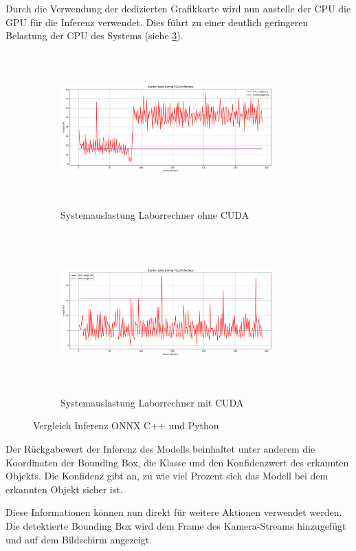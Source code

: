 Durch die Verwendung der dedizierten Grafikkarte wird nun anstelle der CPU die GPU für die Inferenz verwendet. Dies führt zu einer deutlich geringeren Belastung der CPU des Systems (siehe \ref{tab:CPU und RAM-Auslastung CPU vs CUDA}).

\begin{figure}[h!]
\centering
\begin{subfigure}[b]{\textwidth}
  \centering
  \includegraphics[width=0.9\textwidth,height=5.9cm,keepaspectratio]{images/system_load_plot_CPU_Laborrechner.png}
  \caption{Systemauslastung Laborrechner ohne CUDA}
  \label{fig:CPU und RAM-Auslastung ohne CUDA}
\end{subfigure}
\hfill
\begin{subfigure}[b]{\textwidth}
  \centering
  \includegraphics[width=0.9\textwidth,height=6.2cm,keepaspectratio]{images/system_load_plot_CUDA.png}
  \caption{Systemauslastung Laborrechner mit CUDA}
  \label{fig:CPU und RAM-Auslastung mit CUDA}
\end{subfigure}
\caption{Vergleich Inferenz ONNX C++ und Python}
\label{tab:CPU und RAM-Auslastung CPU vs CUDA}
\end{figure}

Der Rückgabewert der Inferenz des Modells beinhaltet unter anderem die Koordinaten der Bounding Box, die Klasse und den Konfidenzwert des erkannten Objekts. Die Konfidenz gibt an, zu wie viel Prozent sich das Modell bei dem erkannten Objekt sicher ist. \cite{InferenzResults} 

Diese Informationen können nun direkt für weitere Aktionen verwendet werden. Die detektierte Bounding Box wird dem Frame des Kamera-Streams hinzugefügt und auf dem Bildschirm angezeigt. 